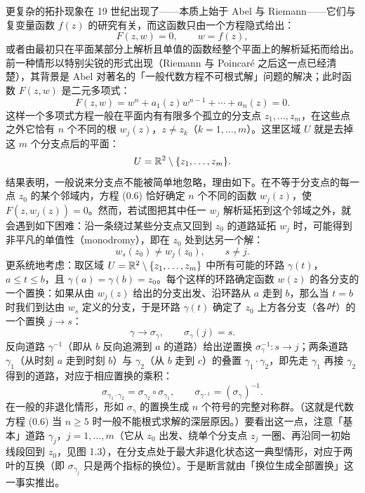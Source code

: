更复杂的拓扑现象在 19 世纪出现了——本质上始于 Abel 与 Riemann——它们与复变量函数 $f(z)$ 的研究有关，而这函数只由一个方程隐式给出：
\begin{equation}
F(z,w)=0,\qquad w=f(z), \tag{0.5}
\end{equation}
或者由最初只在平面某部分上解析且单值的函数经整个平面上的解析延拓而给出。前一种情形以特别尖锐的形式出现（Riemann 与 Poincaré 之后这一点已经清楚），其背景是 Abel 对著名的「一般代数方程不可根式解」问题的解决；此时函数 $F(z,w)$ 是二元多项式：
\begin{equation}
F(z,w)=w^n+a_1(z)w^{n-1}+\cdots+a_n(z)=0. \tag{0.6}
\end{equation}
这样一个多项式方程一般在平面内有有限多个孤立的分支点 $z_1,\dots,z_m$，在这些点之外它恰有 $n$ 个不同的根 $w_j(z)$，$z\ne z_k$（$k=1,\dots,m$）。这里区域 $U$ 就是去掉这 $m$ 个分支点后的平面：
\[
U=\mathbb{R}^2\setminus\{z_1,\dots,z_m\}.
\]
结果表明，一般说来分支点不能被简单地忽略，理由如下。在不等于分支点的每一点 $z_0$ 的某个邻域内，方程 (0.6) 恰好确定 $n$ 个不同的函数 $w_j(z)$，使 $F(z,w_j(z))=0$。然而，若试图把其中任一 $w_j$ 解析延拓到这个邻域之外，就会遇到如下困难：沿一条绕过某些分支点又回到 $z_0$ 的道路延拓 $w_j$ 时，可能得到非平凡的单值性（monodromy），即在 $z_0$ 处到达另一个解：
\[
w_s(z_0)\ne w_j(z_0),\qquad s\ne j.
\]
更系统地考虑：取区域 $U=\mathbb{R}^2\setminus\{z_1,\dots,z_m\}$ 中所有可能的环路 $\gamma(t)$，$a\le t\le b$，且 $\gamma(a)=\gamma(b)=z_0$。每个这样的环路确定函数 $w(z)$ 的各分支的一个置换：如果从由 $w_j(z)$ 给出的分支出发、沿环路从 $a$ 走到 $b$，那么当 $t=b$ 时我们到达由 $w_s$ 定义的分支，于是环路 $\gamma(t)$ 确定了 $z_0$ 上方各分支（各\emph{叶}）的一个置换 $j\to s$：
\[
\gamma\to\sigma_\gamma,\qquad \sigma_\gamma(j)=s.
\]
反向道路 $\gamma^{-1}$（即从 $b$ 反向追溯到 $a$ 的道路）给出逆置换 $\sigma_\gamma^{-1}:s\to j$；两条道路 $\gamma_1$（从时刻 $a$ 走到时刻 $b$）与 $\gamma_2$（从 $b$ 走到 $c$）的叠置 $\gamma_1\cdot\gamma_2$，即先走 $\gamma_1$ 再接 $\gamma_2$ 得到的道路，对应于相应置换的乘积：
\begin{equation}
\sigma_{\gamma_1\cdot\gamma_2}=\sigma_{\gamma_2}\circ\sigma_{\gamma_1},\qquad
\sigma_{\gamma^{-1}}=(\sigma_\gamma)^{-1}. \tag{0.7}
\end{equation}
在一般的非退化情形，形如 $\sigma_\gamma$ 的置换生成 $n$ 个符号的完整对称群。（这就是代数方程 (0.6) 当 $n\ge 5$ 时一般不能根式求解的深层原因。）要看出这一点，注意「基本」道路 $\gamma_j$，$j=1,\dots,m$（它从 $z_0$ 出发、绕单个分支点 $z_j$ 一圈、再沿同一初始线段回到 $z_0$，见图 1.3），在分支点处于最大非退化状态这一典型情形，对应于两叶的互换（即 $\sigma_{\gamma_j}$ 只是两个指标的换位）。于是断言就由「换位生成全部置换」这一事实推出。

